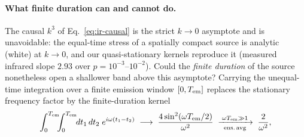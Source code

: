 \documentclass[10pt,prd,aps,nobibnotes,superscriptaddress,preprintnumbers,notitlepage]{revtex4-1}
\begin{document}
\paragraph{What finite duration can and cannot do.} The causal $k^3$ of
Eq.~\eqref{eq:ir-causal} is the strict $k\to0$ asymptote and is unavoidable: the equal-time
stress of a spatially compact source is analytic (white) at $k\to0$, and our quasi-stationary
kernels reproduce it (measured infrared slope $2.93$ over $p=10^{-3}$--$10^{-2}$). Could the
\emph{finite duration} of the source nonetheless open a shallower band above this asymptote?
Carrying the unequal-time integration over a finite emission window $[0,T_{\rm em}]$ replaces
the stationary frequency factor by the finite-duration kernel
\begin{equation}
  \int_0^{T_{\rm em}}\!\!\!\int_0^{T_{\rm em}}\!\! dt_1\,dt_2\;e^{i\omega(t_1-t_2)}
  \;\longrightarrow\;\frac{4\sin^2(\omega T_{\rm em}/2)}{\omega^2}
  \;\xrightarrow[\;\rm ens.\,avg\;]{\;\omega T_{\rm em}\gg1\;}\;\frac{2}{\omega^2},
  \label{eq:duration-kernel}
\end{equation}
\end{document}
